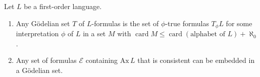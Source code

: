 Let $L$ be a first-order language.
\begin{enumerate}
\item[(a)] Any Gödelian set $T$ of $L$-formulas is the set of $\phi$-true formulas $T_\phi L$ for some interpretation $\phi$ of $L$ in a set $M$ with $\operatorname{card} M \leq \operatorname{card}(\text{alphabet of }L) + \aleph_0$.
\item[(b)] Any set of formulas $\mathcal{E}$ containing $\mathrm{Ax}\,L$ that is consistent can be embedded in a Gödelian set.
\end{enumerate}
